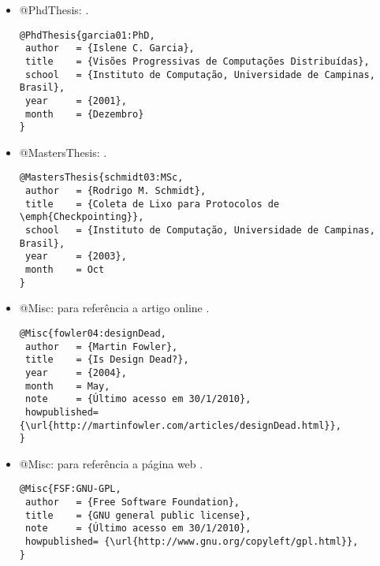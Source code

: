 \begin{itemize}
\item @PhdThesis: \cite{garcia01:PhD}.
{\scriptsize\begin{verbatim}
@PhdThesis{garcia01:PhD,
 author   = {Islene C. Garcia},
 title    = {Visões Progressivas de Computações Distribuídas},
 school   = {Instituto de Computação, Universidade de Campinas, Brasil},
 year     = {2001},
 month    = {Dezembro}
}
\end{verbatim}}

\item @MastersThesis: \cite{schmidt03:MSc}.
{\scriptsize\begin{verbatim}
@MastersThesis{schmidt03:MSc,
 author   = {Rodrigo M. Schmidt},
 title    = {Coleta de Lixo para Protocolos de \emph{Checkpointing}},
 school   = {Instituto de Computação, Universidade de Campinas, Brasil},
 year     = {2003},
 month    = Oct
}
\end{verbatim}}

\item @Misc: para referência a artigo online \cite{fowler04:designDead}.
{\scriptsize\begin{verbatim}
@Misc{fowler04:designDead,
 author   = {Martin Fowler},
 title    = {Is Design Dead?},
 year     = {2004},
 month    = May,
 note     = {Último acesso em 30/1/2010},
 howpublished= {\url{http://martinfowler.com/articles/designDead.html}},
}
\end{verbatim}}

\item @Misc: para referência a página web \cite{FSF:GNU-GPL}.
{\scriptsize\begin{verbatim}
@Misc{FSF:GNU-GPL,
 author   = {Free Software Foundation},
 title    = {GNU general public license},
 note     = {Último acesso em 30/1/2010},
 howpublished= {\url{http://www.gnu.org/copyleft/gpl.html}},
}
\end{verbatim}}

\end{itemize}

